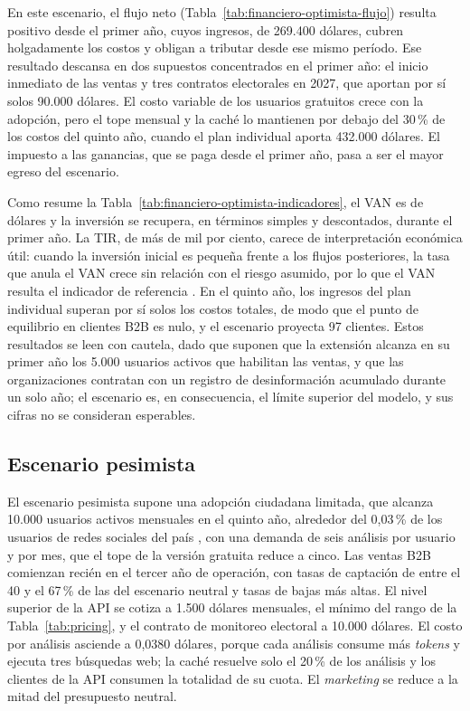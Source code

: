 

En este escenario, el flujo neto (Tabla~\ref{tab:financiero-optimista-flujo}) resulta positivo desde el primer año, cuyos ingresos, de 269.400 dólares, cubren holgadamente los costos y obligan a tributar desde ese mismo período. Ese resultado descansa en dos supuestos concentrados en el primer año: el inicio inmediato de las ventas y tres contratos electorales en 2027, que aportan por sí solos 90.000 dólares. El costo variable de los usuarios gratuitos crece con la adopción, pero el tope mensual y la caché lo mantienen por debajo del 30\,\% de los costos del quinto año, cuando el plan individual aporta 432.000 dólares. El impuesto a las ganancias, que se paga desde el primer año, pasa a ser el mayor egreso del escenario.



Como resume la Tabla~\ref{tab:financiero-optimista-indicadores}, el VAN es de \finOptVan{} dólares y la inversión se recupera, en términos simples y descontados, durante el primer año. La TIR, de más de mil por ciento, carece de interpretación económica útil: cuando la inversión inicial es pequeña frente a los flujos posteriores, la tasa que anula el VAN crece sin relación con el riesgo asumido, por lo que el VAN resulta el indicador de referencia \parencite{RossEtAl2013}. En el quinto año, los ingresos del plan individual superan por sí solos los costos totales, de modo que el punto de equilibrio en clientes B2B es nulo, y el escenario proyecta 97 clientes. Estos resultados se leen con cautela, dado que suponen que la extensión alcanza en su primer año los 5.000 usuarios activos que habilitan las ventas, y que las organizaciones contratan con un registro de desinformación acumulado durante un solo año; el escenario es, en consecuencia, el límite superior del modelo, y sus cifras no se consideran esperables.



\subsection{Escenario pesimista}

El escenario pesimista supone una adopción ciudadana limitada, que alcanza 10.000 usuarios activos mensuales en el quinto año, alrededor del 0,03\,\% de los usuarios de redes sociales del país \parencite{DataReportal2024}, con una demanda de seis análisis por usuario y por mes, que el tope de la versión gratuita reduce a cinco. Las ventas B2B comienzan recién en el tercer año de operación, con tasas de captación de entre el 40 y el 67\,\% de las del escenario neutral y tasas de bajas más altas. El nivel superior de la API se cotiza a 1.500 dólares mensuales, el mínimo del rango de la Tabla~\ref{tab:pricing}, y el contrato de monitoreo electoral a 10.000 dólares. El costo por análisis asciende a 0,0380 dólares, porque cada análisis consume más \textit{tokens} y ejecuta tres búsquedas web; la caché resuelve solo el 20\,\% de los análisis y los clientes de la API consumen la totalidad de su cuota. El \textit{marketing} se reduce a la mitad del presupuesto neutral.

